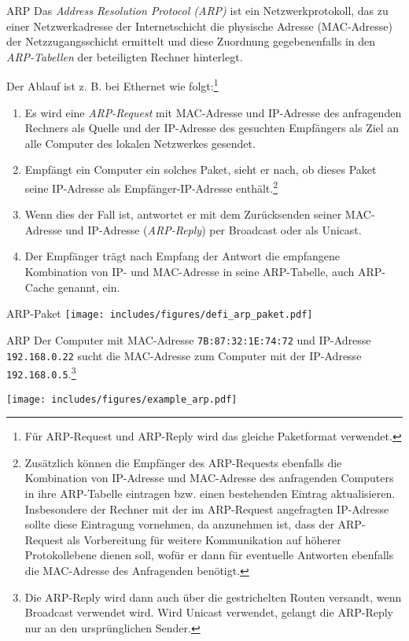 \begin{defi}{ARP}
    Das \emph{Address Resolution Protocol (ARP)} ist ein Netzwerkprotokoll, das zu einer Netzwerkadresse der Internetschicht die physische Adresse (MAC-Adresse) der Netzzugangsschicht ermittelt und diese Zuordnung gegebenenfalls in den \emph{ARP-Tabellen} der beteiligten Rechner hinterlegt.

    Der Ablauf ist z. B. bei Ethernet wie folgt:\footnote{Für ARP-Request und ARP-Reply wird das gleiche Paketformat verwendet.}
    \begin{enumerate}
        \item Es wird eine \emph{ARP-Request} mit MAC-Adresse und IP-Adresse des anfragenden Rechners als Quelle und der IP-Adresse des gesuchten Empfängers als Ziel an alle Computer des lokalen Netzwerkes gesendet.
        \item Empfängt ein Computer ein solches Paket, sieht er nach, ob dieses Paket seine IP-Adresse als Empfänger-IP-Adresse enthält.\footnote{Zusätzlich können die Empfänger des ARP-Requests ebenfalls die Kombination von IP-Adresse und MAC-Adresse des anfragenden Computers in ihre ARP-Tabelle eintragen bzw. einen bestehenden Eintrag aktualisieren. Insbesondere der Rechner mit der im ARP-Request angefragten IP-Adresse sollte diese Eintragung vornehmen, da anzunehmen ist, dass der ARP-Request als Vorbereitung für weitere Kommunikation auf höherer Protokollebene dienen soll, wofür er dann für eventuelle Antworten ebenfalls die MAC-Adresse des Anfragenden benötigt.}
        \item Wenn dies der Fall ist, antwortet er mit dem Zurücksenden seiner MAC-Adresse und IP-Adresse (\emph{ARP-Reply}) per Broadcast oder als Unicast.
        \item Der Empfänger trägt nach Empfang der Antwort die empfangene Kombination von IP- und MAC-Adresse in seine ARP-Tabelle, auch ARP-Cache genannt, ein.
    \end{enumerate}
\end{defi}

\begin{bonus}{ARP-Paket}
    \centering
    \texttt{[image: includes/figures/defi\_arp\_paket.pdf]}
\end{bonus}

\begin{example}{ARP}
    Der Computer mit MAC-Adresse \texttt{7B:87:32:1E:74:72} und IP-Adresse \texttt{192.168.0.22} sucht die MAC-Adresse zum Computer mit der IP-Adresse \texttt{192.168.0.5}.\footnote{Die ARP-Reply wird dann auch über die gestrichelten Routen versandt, wenn Broadcast verwendet wird. Wird Unicast verwendet, gelangt die ARP-Reply nur an den ursprünglichen Sender.}

    \centering
    \texttt{[image: includes/figures/example\_arp.pdf]}
\end{example}

